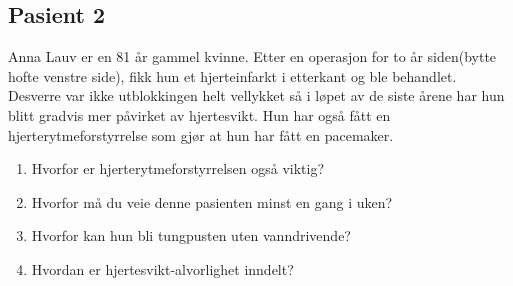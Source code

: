 			\subsection{Pasient 2}
				Anna Lauv er en 81 år gammel kvinne. Etter en operasjon for to år siden(bytte hofte venstre side), fikk hun et hjerteinfarkt i etterkant og ble behandlet. Desverre var ikke utblokkingen helt vellykket så i løpet av de siste årene har hun blitt gradvis mer påvirket av hjertesvikt. Hun har også fått en hjerterytmeforstyrrelse som gjør at hun har fått en pacemaker.
				\begin{enumerate}
					\item Hvorfor er hjerterytmeforstyrrelsen også viktig?
					\item Hvorfor må du veie denne pasienten minst en gang i uken?
					\item Hvorfor kan hun bli tungpusten uten vanndrivende?
					\item Hvordan er hjertesvikt-alvorlighet inndelt?
				\end{enumerate}

